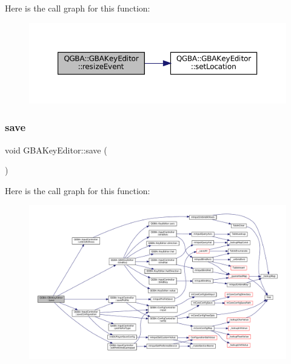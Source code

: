 Here is the call graph for this function\+:
\nopagebreak
\begin{figure}[H]
\begin{center}
\leavevmode
\includegraphics[width=350pt]{class_q_g_b_a_1_1_g_b_a_key_editor_a38f5e33d0c9c1234395c4f3b0a6b0349_cgraph}
\end{center}
\end{figure}
\mbox{\label{class_q_g_b_a_1_1_g_b_a_key_editor_a5ba1c13fc509a7344afda968e6521436}} 
\subsubsection{\texorpdfstring{save}{save}}
{\footnotesize\ttfamily void G\+B\+A\+Key\+Editor\+::save (\begin{DoxyParamCaption}{ }\end{DoxyParamCaption})\hspace{0.3cm}{\ttfamily [slot]}}

Here is the call graph for this function\+:
\nopagebreak
\begin{figure}[H]
\begin{center}
\leavevmode
\includegraphics[width=350pt]{class_q_g_b_a_1_1_g_b_a_key_editor_a5ba1c13fc509a7344afda968e6521436_cgraph}
\end{center}
\end{figure}
\mbox{\label{class_q_g_b_a_1_1_g_b_a_key_editor_a4069ad1c61470f1d304aa7b7cf944261}} 
